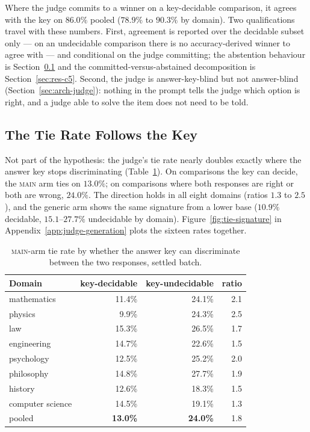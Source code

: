 Where the judge commits to a winner on a
key-decidable comparison, it agrees with the key on $86.0\%$ pooled
($78.9\%$ to $90.3\%$ by domain). Two qualifications travel with these
numbers. First, agreement is reported over the decidable subset only
--- on an undecidable comparison there is no accuracy-derived winner to
agree with --- and conditional on the judge committing; the abstention
behaviour is Section~\ref{sec:res-tie-signature} and the
committed-versus-abstained decomposition is Section~\ref{sec:res-c5}.
Second, the judge is answer-key-blind but not answer-blind
(Section~\ref{sec:arch-judge}): nothing in the prompt tells the judge
which option is right, and a judge able to solve the item does not
need to be told.

\subsection{The Tie Rate Follows the Key}\label{sec:res-tie-signature}

Not part of the hypothesis: the judge's tie
rate nearly doubles exactly where the answer key stops discriminating
(Table~\ref{tab:tie-by-key}). On comparisons the key can decide, the
\textsc{main} arm ties on $13.0\%$; on comparisons where both responses
are right or both are wrong, $24.0\%$. The direction holds in all eight
domains (ratios $1.3$ to $2.5$), and the generic arm shows the same
signature from a lower base ($10.9\%$ decidable, $15.1$--$27.7\%$
undecidable by domain). Figure~\ref{fig:tie-signature} in
Appendix~\ref{app:judge-generation} plots the sixteen rates together.

\begin{table}[htbp]
\centering
\caption{\textsc{main}-arm tie rate by whether the answer key can
discriminate between the two responses, settled batch.}
\label{tab:tie-by-key}
\begin{tabular}{lrrr}
\toprule
Domain & key-decidable & key-undecidable & ratio \\
\midrule
mathematics      & 11.4\% & 24.1\% & 2.1 \\
physics          &  9.9\% & 24.3\% & 2.5 \\
law              & 15.3\% & 26.5\% & 1.7 \\
engineering      & 14.7\% & 22.6\% & 1.5 \\
psychology       & 12.5\% & 25.2\% & 2.0 \\
philosophy       & 14.8\% & 27.7\% & 1.9 \\
history          & 12.6\% & 18.3\% & 1.5 \\
computer science & 14.5\% & 19.1\% & 1.3 \\
\midrule
pooled           & \textbf{13.0\%} & \textbf{24.0\%} & 1.8 \\
\bottomrule
\end{tabular}
\end{table}

